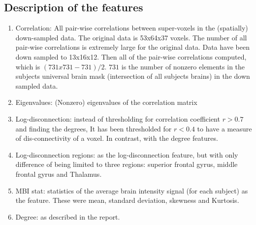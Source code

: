 \documentclass{article} %
\begin{document}
\subsection{Description of the features }
\begin{enumerate}


\item Correlation: All pair-wise correlations between super-voxels in the (spatially) down-sampled data. The original data is 53x64x37 voxels. The number of all pair-wise correlations is extremely large for the original data. Data have been down sampled to 13x16x12. Then all of the pair-wise correlations computed, which is $(731x731-731)/2$. $731$ is the number of nonzero elements in the subjects universal brain mask (intersection of all subjects brains) in the down sampled data.

\item Eigenvalues: (Nonzero) eigenvalues of the correlation matrix

\item Log-disconnection: instead of thresholding for correlation coefficient $r > 0.7$ and finding the degrees, It has been thresholded for $r <0.4$ to have a measure of dis-connectivity of a voxel. In contrast, with the degree features. 

\item Log-disconnection regions: as the log-disconnection feature, but with only difference of being limited to three regions: superior frontal gyrus, middle frontal gyrus and Thalamus.  

\item MBI stat: statistics of the average brain intensity signal (for each subject) as the feature. These were mean, standard deviation, skewness and Kurtosis.

\item Degree: as described in the report.
\end{enumerate}
\end{document}
